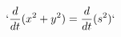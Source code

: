 \documentclass[preview]{standalone}
\begin{document}
\begin{align*}
`\frac{d}{dt}(x^2 + y^2) = \frac{d}{dt}(s^2)`
\end{align*}
\end{document}

